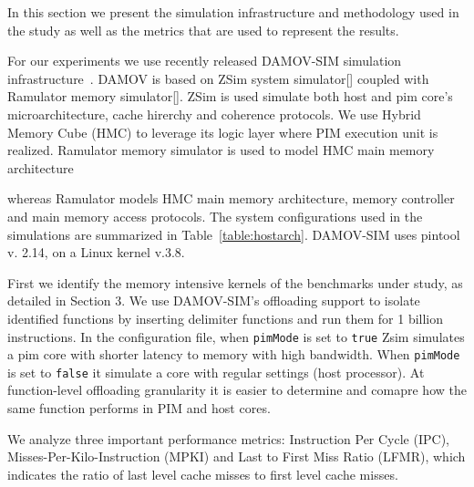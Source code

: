 

In this section we present the simulation infrastructure and methodology used in the study as well as the metrics that are used to represent the results.  

For our experiments we use recently released DAMOV-SIM simulation infrastructure~\cite{71}. DAMOV is based on ZSim system simulator[] coupled with Ramulator memory simulator[]. ZSim is used simulate both host and pim core's microarchitecture, cache hirerchy and coherence protocols. We use Hybrid Memory Cube (HMC) \fixme{[cite]} to leverage its logic layer where PIM execution unit is realized. Ramulator memory simulator is used to model HMC main memory architecture 



whereas Ramulator models HMC main memory architecture, memory controller and main memory access protocols. The system configurations used in the simulations are summarized in Table~\ref{table:hostarch}. DAMOV-SIM uses pintool v. 2.14, on a Linux kernel v.3.8.  

First we identify the memory intensive kernels of the benchmarks under study, as detailed in Section 3. We use DAMOV-SIM's offloading support to isolate identified functions by inserting delimiter functions and run them for 1 billion instructions. In the configuration file, when \texttt{pimMode} is set to \texttt{true} Zsim simulates a pim core with shorter latency to memory with high bandwidth. When \texttt{pimMode} is set to \texttt{false} it simulate a core with regular settings (host processor). At function-level offloading granularity it is easier to determine and comapre how the same function performs in PIM and host cores. %

We analyze three important performance metrics: Instruction Per Cycle (IPC), Misses-Per-Kilo-Instruction (MPKI) and Last to First Miss Ratio (LFMR), which indicates the ratio of last level cache misses to first level cache misses.    










